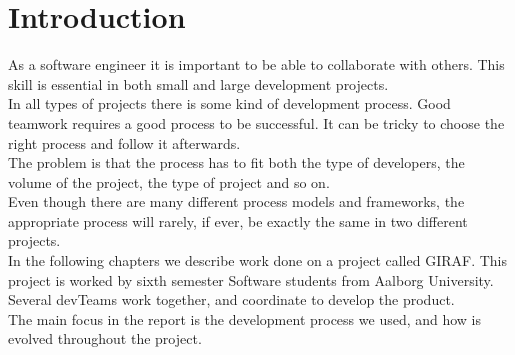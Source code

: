 \section{Introduction}

As a software engineer it is important to be able to collaborate with others. This skill is essential in both small and large development projects. \\
In all types of projects there is some kind of development process. Good teamwork requires a good process to be successful. It can be tricky to choose the right process and follow it afterwards. \\
The problem is that the process has to fit both the type of developers, the volume of the project, the type of project and so on. \\
Even though there are many different process models and frameworks, the appropriate process will rarely, if ever, be exactly the same in two different projects.\\
In the following chapters we describe work done on a project called GIRAF. This project is worked by sixth semester Software students from Aalborg University. Several \glspl{devTeam} work together, and coordinate to develop the product.\\
The main focus in the report is the development process we used, and how is evolved throughout the project.\\